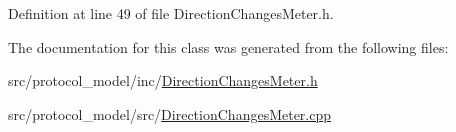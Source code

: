 Definition at line 49 of file Direction\-Changes\-Meter.\-h.



The documentation for this class was generated from the following files\-:\begin{DoxyCompactItemize}
\item 
src/protocol\-\_\-model/inc/\hyperlink{_direction_changes_meter_8h}{Direction\-Changes\-Meter.\-h}\item 
src/protocol\-\_\-model/src/\hyperlink{_direction_changes_meter_8cpp}{Direction\-Changes\-Meter.\-cpp}\end{DoxyCompactItemize}
